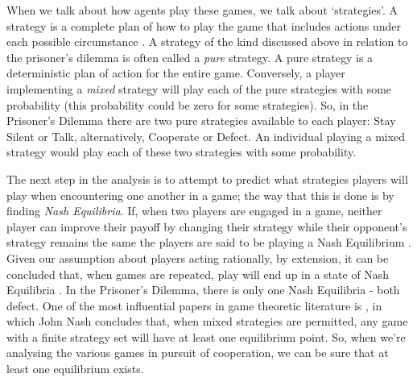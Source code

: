 \documentclass[11pt]{article}
\newcommand*{\np}{\par\noindent\newline}
\begin{document}
\np When we talk about how agents play these games, we talk about `strategies'. A strategy is a complete plan of how to
play the game that includes actions under each possible circumstance \citep{angner_course_2012}. A strategy of the kind
discussed above in relation to the prisoner's dilemma is often called a \textit{pure} strategy. A pure strategy is a
deterministic plan of action for the entire game. Conversely, a player implementing a \textit{mixed} strategy will play
each of the pure strategies with some probability (this probability could be zero for some strategies). So, in the
Prisoner's Dilemma there are two pure strategies available to each player: Stay Silent or Talk, alternatively, Cooperate
or Defect. An individual playing a mixed strategy would play each of these two strategies with some probability.

\np The next step in the analysis is to attempt to predict what strategies players will play when encountering one
another in a game; the way that this is done is by finding \textit{Nash Equilibria}. If, when two players are engaged in
a game, neither player can improve their payoff by changing their strategy while their opponent's strategy remains the
same the players are said to be playing a Nash Equilibrium \citep{angner_course_2012}. Given our assumption about
players acting rationally, by extension, it can be concluded that, when games are repeated, play will end up in a state
of Nash Equilibria \citep{kalai_rational_1993}. In the Prisoner's Dilemma, there is only one Nash Equilibria - both
defect. One of the most influential papers in game theoretic literature is \citet{nash_equilibrium_1950}, in which John
Nash concludes that, when mixed strategies are permitted, any game with a finite strategy set will have at least one
equilibrium point. So, when we're analysing the various games in pursuit of cooperation, we can be sure that at
least one equilibrium exists.
\end{document}
